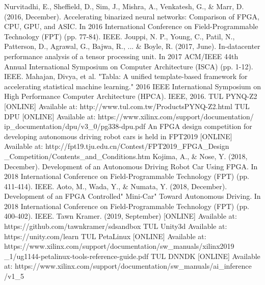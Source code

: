 \documentclass[conference]{IEEEtran}
\begin{document}
\begin{thebibliography}{00}

 Nurvitadhi, E., Sheffield, D., Sim, J., Mishra, A., Venkatesh, G., \& Marr, D. (2016, December). Accelerating binarized neural networks: Comparison of FPGA, CPU, GPU, and ASIC. In 2016 International Conference on Field-Programmable Technology (FPT) (pp. 77-84). IEEE.
 Jouppi, N. P., Young, C., Patil, N., Patterson, D., Agrawal, G., Bajwa, R., ... \& Boyle, R. (2017, June). In-datacenter performance analysis of a tensor processing unit. In 2017 ACM/IEEE 44th Annual International Symposium on Computer Architecture (ISCA) (pp. 1-12). IEEE.
 Mahajan, Divya, et al. "Tabla: A unified template-based framework for accelerating statistical machine learning." 2016 IEEE International Symposium on High Performance Computer Architecture (HPCA). IEEE, 2016.
 TUL PYNQ-Z2 [ONLINE] Available at: http://www.tul.com.tw/ProductsPYNQ-Z2.html  
 TUL DPU [ONLINE] Available at: https://www.xilinx.com/support/documentation/ ip\_documentation/dpu/v3\_0/pg338-dpu.pdf
 An FPGA design competition for developing autonomous driving robot cars is held in FPT2019 [ONLINE] Available at: http://fpt19.tju.edu.cn/Contest/FPT2019\_FPGA\_Design \_Competition/Contents\_and\_Conditions.htm
 Kojima, A., \& Nose, Y. (2018, December). Development of an Autonomous Driving Robot Car Using FPGA. In 2018 International Conference on Field-Programmable Technology (FPT) (pp. 411-414). IEEE.
 Aoto, M., Wada, Y., \& Numata, Y. (2018, December). Development of an FPGA Controlled" Mini-Car" Toward Autonomous Driving. In 2018 International Conference on Field-Programmable Technology (FPT) (pp. 400-402). IEEE.
 Tawn Kramer. (2019, September) [ONLINE] Available at: https://github.com/tawnkramer/sdsandbox
 TUL Unity3d Available at: https://unity.com/learn
 TUL PetaLinux [ONLINE] Available at: https://www.xilinx.com/support/documentation/sw\_manuals/xilinx2019 \_1/ug1144-petalinux-tools-reference-guide.pdf
 TUL DNNDK [ONLINE] Available at: https://www.xilinx.com/support/documentation/sw\_manuals/ai\_inference /v1\_5
\end{thebibliography}
\vspace{12pt}
\end{document}
